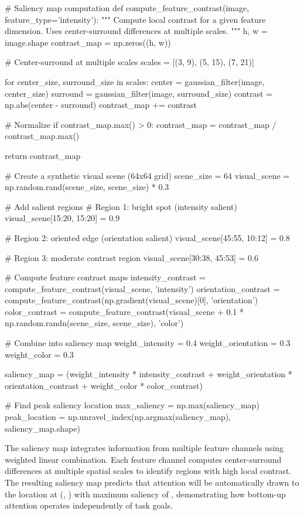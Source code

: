 \documentclass[a4paper, 11pt]{article}
\begin{document}
\begin{pycode}
# Saliency map computation
def compute_feature_contrast(image, feature_type='intensity'):
    """
    Compute local contrast for a given feature dimension.
    Uses center-surround differences at multiple scales.
    """
    h, w = image.shape
    contrast_map = np.zeros((h, w))

    # Center-surround at multiple scales
    scales = [(3, 9), (5, 15), (7, 21)]

    for center_size, surround_size in scales:
        center = gaussian_filter(image, center_size)
        surround = gaussian_filter(image, surround_size)
        contrast = np.abs(center - surround)
        contrast_map += contrast

    # Normalize
    if contrast_map.max() > 0:
        contrast_map = contrast_map / contrast_map.max()

    return contrast_map

# Create a synthetic visual scene (64x64 grid)
scene_size = 64
visual_scene = np.random.rand(scene_size, scene_size) * 0.3

# Add salient regions
# Region 1: bright spot (intensity salient)
visual_scene[15:20, 15:20] = 0.9

# Region 2: oriented edge (orientation salient)
visual_scene[45:55, 10:12] = 0.8

# Region 3: moderate contrast region
visual_scene[30:38, 45:53] = 0.6

# Compute feature contrast maps
intensity_contrast = compute_feature_contrast(visual_scene, 'intensity')
orientation_contrast = compute_feature_contrast(np.gradient(visual_scene)[0], 'orientation')
color_contrast = compute_feature_contrast(visual_scene + 0.1 * np.random.randn(scene_size, scene_size), 'color')

# Combine into saliency map
weight_intensity = 0.4
weight_orientation = 0.3
weight_color = 0.3

saliency_map = (weight_intensity * intensity_contrast +
                weight_orientation * orientation_contrast +
                weight_color * color_contrast)

# Find peak saliency location
max_saliency = np.max(saliency_map)
peak_location = np.unravel_index(np.argmax(saliency_map), saliency_map.shape)
\end{pycode}

The saliency map integrates information from multiple feature channels using weighted linear combination. Each feature channel computes center-surround differences at multiple spatial scales to identify regions with high local contrast. The resulting saliency map predicts that attention will be automatically drawn to the location at (, ) with maximum saliency of , demonstrating how bottom-up attention operates independently of task goals.
\end{document}
